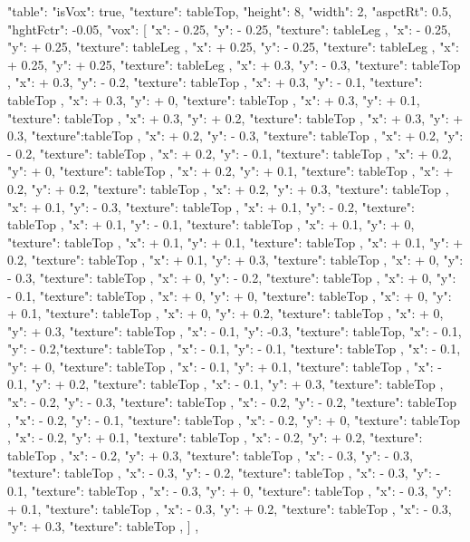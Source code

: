 {  "table": {
    "isVox": true,
    "texture": tableTop,
    "height": 8,
    "width": 2,
    "aspctRt": 0.5,
    "hghtFctr": -0.05,
    "vox": [
      { "x": - 0.25, "y": - 0.25, "texture": tableLeg },
      { "x": - 0.25, "y": + 0.25, "texture": tableLeg },
      { "x": + 0.25, "y": - 0.25, "texture": tableLeg },
      { "x": + 0.25, "y": + 0.25, "texture": tableLeg },
      { "x": + 0.3, "y": - 0.3, "texture": tableTop },
      { "x": + 0.3, "y": - 0.2, "texture": tableTop },
      { "x": + 0.3, "y": - 0.1, "texture": tableTop },
      { "x": + 0.3, "y": + 0, "texture": tableTop },
      { "x": + 0.3, "y": + 0.1, "texture": tableTop },
      { "x": + 0.3, "y": + 0.2, "texture": tableTop },
      { "x": + 0.3, "y": + 0.3, "texture":tableTop },
      { "x": + 0.2, "y": - 0.3, "texture": tableTop },
      { "x": + 0.2, "y": - 0.2, "texture": tableTop },
      { "x": + 0.2, "y": - 0.1, "texture": tableTop },
      { "x": + 0.2, "y": + 0, "texture": tableTop },
      { "x": + 0.2, "y": + 0.1, "texture": tableTop },
      { "x": + 0.2, "y": + 0.2, "texture": tableTop },
      { "x": + 0.2, "y": + 0.3, "texture": tableTop },
      { "x": + 0.1, "y": - 0.3, "texture": tableTop },
      { "x": + 0.1, "y": - 0.2, "texture": tableTop },
      { "x": + 0.1, "y": - 0.1, "texture": tableTop },
      { "x": + 0.1, "y": + 0, "texture": tableTop },
      { "x": + 0.1, "y": + 0.1, "texture": tableTop },
      { "x": + 0.1, "y": + 0.2, "texture": tableTop },
      { "x": + 0.1, "y": + 0.3, "texture": tableTop },
      { "x": + 0, "y": - 0.3, "texture": tableTop },
      { "x": + 0, "y": - 0.2, "texture": tableTop },
      { "x": + 0, "y": - 0.1, "texture": tableTop },
      { "x": + 0, "y": + 0, "texture": tableTop },
      { "x": + 0, "y": + 0.1, "texture": tableTop },
      { "x": + 0, "y": + 0.2, "texture": tableTop },
      { "x": + 0, "y": + 0.3, "texture": tableTop },
      { "x": - 0.1, "y":  -0.3, "texture": tableTop},
      { "x": - 0.1, "y": - 0.2,"texture": tableTop },
      { "x": - 0.1, "y": - 0.1, "texture": tableTop },
      { "x": - 0.1, "y": + 0, "texture": tableTop },
      { "x": - 0.1, "y": + 0.1, "texture": tableTop },
      { "x": - 0.1, "y": + 0.2, "texture": tableTop },
      { "x": - 0.1, "y": + 0.3, "texture": tableTop },
      { "x": - 0.2, "y": - 0.3, "texture": tableTop },
      { "x": - 0.2, "y": - 0.2, "texture": tableTop },
      { "x": - 0.2, "y": - 0.1, "texture": tableTop },
      { "x": - 0.2, "y": + 0, "texture": tableTop },
      { "x": - 0.2, "y": + 0.1, "texture": tableTop },
      { "x": - 0.2, "y": + 0.2, "texture": tableTop },
      { "x": - 0.2, "y": + 0.3, "texture": tableTop },
      { "x": - 0.3, "y": - 0.3, "texture": tableTop },
      { "x": - 0.3, "y": - 0.2, "texture": tableTop },
      { "x": - 0.3, "y": - 0.1, "texture": tableTop },
      { "x": - 0.3, "y": + 0, "texture": tableTop },
      { "x": - 0.3, "y": + 0.1, "texture": tableTop },
      { "x": - 0.3, "y": + 0.2, "texture": tableTop },
      { "x": - 0.3, "y": + 0.3, "texture": tableTop },
    ]
  },


}
